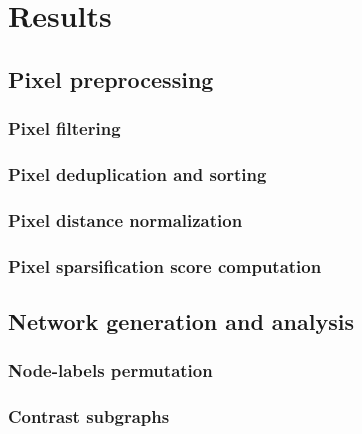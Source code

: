 \graphicspath{{chapters/05_results/}}
\chapter{Results}


\section{Pixel preprocessing}

\subsection{Pixel filtering}

\subsection{Pixel deduplication and sorting}

\subsection{Pixel distance normalization}

\subsection{Pixel sparsification score computation}



\section{Network generation and analysis}

\subsection{Node-labels permutation}

\subsection{Contrast subgraphs}

